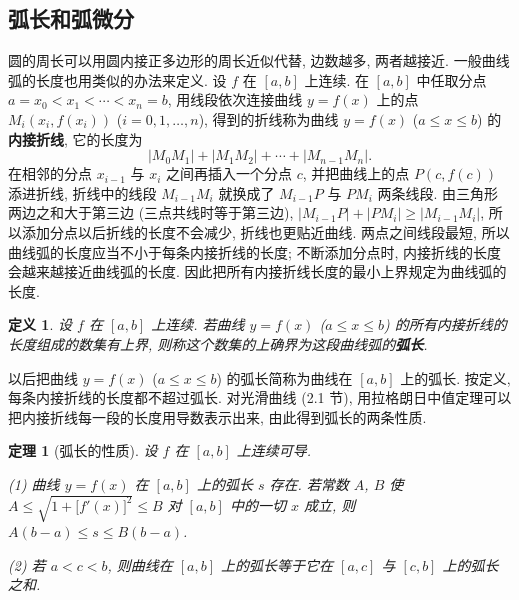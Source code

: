 \documentclass[UTF8,openany]{ctexbook}
\theoremstyle{chinesetextbook}
\newtheorem{definition}{定义}[section]
\newtheorem{theorem}{定理}[section]
\begin{document}
\subsection{弧长和弧微分}
圆的周长可以用圆内接正多边形的周长近似代替, 边数越多, 两者越接近. 一般曲线弧的长度也用类似的办法来定义. 设 $f$ 在 $[a,b]$ 上连续. 在 $[a,b]$ 中任取分点 $a=x_0<x_1<\cdots<x_n=b$, 用线段依次连接曲线 $y=f(x)$ 上的点 $M_i(x_i,f(x_i))$ ($i=0,1,\ldots,n$), 得到的折线称为曲线 $y=f(x)$ ($a\le x\le b$) 的\textbf{内接折线}, 它的长度为
\[
|M_0M_1|+|M_1M_2|+\cdots+|M_{n-1}M_n|.
\]
在相邻的分点 $x_{i-1}$ 与 $x_i$ 之间再插入一个分点 $c$, 并把曲线上的点 $P(c,f(c))$ 添进折线, 折线中的线段 $M_{i-1}M_i$ 就换成了 $M_{i-1}P$ 与 $PM_i$ 两条线段. 由三角形两边之和大于第三边 (三点共线时等于第三边), $|M_{i-1}P|+|PM_i|\ge|M_{i-1}M_i|$, 所以添加分点以后折线的长度不会减少, 折线也更贴近曲线. 两点之间线段最短, 所以曲线弧的长度应当不小于每条内接折线的长度; 不断添加分点时, 内接折线的长度会越来越接近曲线弧的长度. 因此把所有内接折线长度的最小上界规定为曲线弧的长度.
\begin{definition}\label{def:c2-11-arc}
设 $f$ 在 $[a,b]$ 上连续. 若曲线 $y=f(x)$ ($a\le x\le b$) 的所有内接折线的长度组成的数集有上界, 则称这个数集的上确界为这段曲线弧的\textbf{弧长}.
\end{definition}
以后把曲线 $y=f(x)$ ($a\le x\le b$) 的弧长简称为曲线在 $[a,b]$ 上的弧长. 按定义, 每条内接折线的长度都不超过弧长. 对光滑曲线 (2.1 节), 用拉格朗日中值定理可以把内接折线每一段的长度用导数表示出来, 由此得到弧长的两条性质.
\begin{theorem}[弧长的性质]\label{thm:c2-11-arc}
设 $f$ 在 $[a,b]$ 上连续可导.

\textup{(1)} 曲线 $y=f(x)$ 在 $[a,b]$ 上的弧长 $s$ 存在. 若常数 $A$, $B$ 使 $A\le\sqrt{1+\bigl[f'(x)\bigr]^2}\le B$ 对 $[a,b]$ 中的一切 $x$ 成立, 则 $A(b-a)\le s\le B(b-a)$.

\textup{(2)} 若 $a<c<b$, 则曲线在 $[a,b]$ 上的弧长等于它在 $[a,c]$ 与 $[c,b]$ 上的弧长之和.
\end{theorem}
\end{document}
